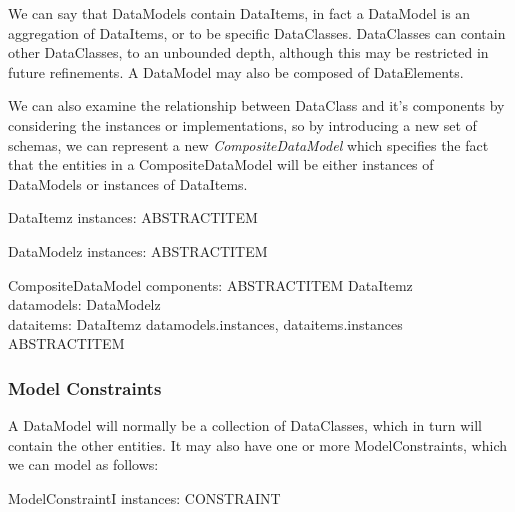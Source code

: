 \documentclass[a4paper,twoside]{article}
\begin{document}
We can say that DataModels contain DataItems, in fact a DataModel is an aggregation of DataItems, or to be specific DataClasses. DataClasses can contain other DataClasses, to an unbounded depth, although this may be restricted in future refinements. A DataModel may also be composed of DataElements. 

We can also examine the relationship between DataClass and it's components by considering the instances or implementations, so by introducing a new set of schemas, we can represent a new \emph{CompositeDataModel} which specifies the fact that the entities in a CompositeDataModel will be either instances of DataModels or instances of DataItems.

\begin{schema}{DataItemz}
	instances: \finset ABSTRACTITEM\\
\end{schema}

\begin{schema}{DataModelz}
	instances: \finset ABSTRACTITEM\\
\end{schema}

\begin{schema}{CompositeDataModel}
	components: ABSTRACTITEM \rel DataItemz \\
	datamodels: DataModelz\\
	dataitems: DataItemz
	\where
	\langle datamodels.instances, dataitems.instances \rangle \\
	\partition ABSTRACTITEM\\
\end{schema}

\subsubsection{Model Constraints}

A DataModel will normally be a collection of DataClasses, which in turn will contain the other entities. It may also have one or more ModelConstraints, which we can model as follows:


\begin{zed}
\end{zed}


\begin{schema}{ModelConstraintI}
	instances: \finset CONSTRAINT\\
\end{schema}
\end{document}
